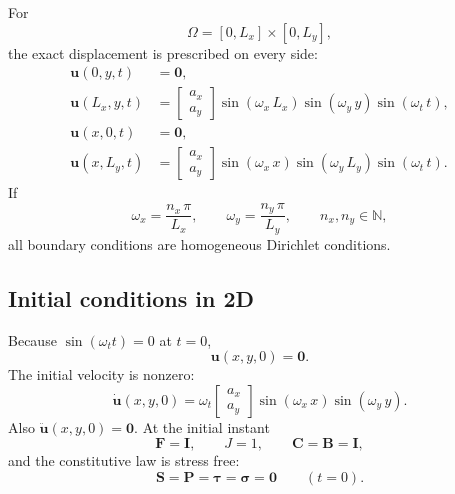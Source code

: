 \documentclass[11pt,a4paper]{article}
\newcommand{\Id}{\textbf{I}}
\begin{document}
For
%
\begin{equation}
\Omega=[0,L_x]\times[0,L_y],
\end{equation}
%
the exact displacement is prescribed on every side:
%
\begin{align}
\textbf{u}(0,y,t)&=\textbf{0},\\
\textbf{u}(L_x,y,t)&=
\begin{bmatrix}a_x\\a_y\end{bmatrix}
\sin(\omega_x\,L_x)\sin(\omega_y\,y)\sin(\omega_t\,t),\\
\textbf{u}(x,0,t)&=\textbf{0},\\
\textbf{u}(x,L_y,t)&=
\begin{bmatrix}a_x\\a_y\end{bmatrix}
\sin(\omega_x\,x)\sin(\omega_y\,L_y)\sin(\omega_t\,t).
\end{align}
%
If
%
\begin{equation}
\omega_x=\dfrac{n_x\,\pi}{L_x},
\qquad
\omega_y=\dfrac{n_y\,\pi}{L_y},
\qquad n_x,n_y\in\mathbb{N},
\end{equation}
%
all boundary conditions are homogeneous Dirichlet conditions.

\subsection{Initial conditions in 2D}

Because $\sin(\omega_t t)=0$ at $t=0$,
%
\begin{equation}
\boxed{\textbf{u}(x,y,0)=\textbf{0}}.
\label{eq_u0_2D}
\end{equation}
%
The initial velocity is nonzero:
%
\begin{equation}
\boxed{
\dot{\textbf{u}}(x,y,0)
=\omega_t
\begin{bmatrix}a_x\\a_y\end{bmatrix}
\sin(\omega_x\,x)\sin(\omega_y\,y)
}.
\label{eq_v0_2D}
\end{equation}
%
Also $\ddot{\textbf{u}}(x,y,0)=\textbf{0}$. At the initial instant
%
\begin{equation}
\textbf{F}=\Id,
\qquad J=1,
\qquad \textbf{C}=\textbf{B}=\Id,
\end{equation}
%
and the constitutive law is stress free:
%
\begin{equation}
\boxed{
\textbf{S}=\textbf{P}=\boldsymbol{\tau}=\boldsymbol{\sigma}=\textbf{0}
\qquad (t=0)
}.
\end{equation}
\end{document}
